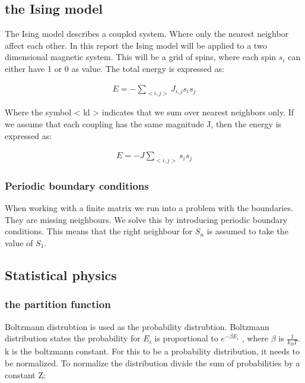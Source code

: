 
\subsection{the Ising model}

The Ising model describes a coupled system. Where only the nearest neighbor affect each other. In this report the Ising model will be applied to a two dimensional magnetic system. This will be a grid of spins, where each spin $s_i$ can either have 1 or 0 as value. The total energy is expressed as: 


\begin{align*}
	E = - \sum_{<i,j>} J_{i,j} s_i s_j
\end{align*}

Where the symbol < kl > indicates that we sum over nearest neighbors only.
If we assume that each coupling has the same magnitude J, then the energy is expressed as: 

\begin{align}
	E = - J \sum_{<i,j>} s_i s_j
	\label{eq:ising-energy}
\end{align}

\subsubsection{Periodic boundary conditions}

When working with a finite matrix we run into a problem with the boundaries. They are missing neighbours. We solve this by introducing periodic boundary conditions. This means that the right neighbour for $S_n$ is assumed to take the value of $S_1$. 

\subsection{Statistical physics}

\subsubsection{the partition function}\label{sec:z-func}

Boltzmann distrubtion is used as the probability distrubtion. Boltzmann distribution states the probability for $E_i$ is proportional to $e^{-\beta E_i}$ , where $\beta$ is $\frac{1}{k_BT}$. k is the boltzmann constant. For this to be a probability distribution, it needs to be normalized. To normalize the distribution divide the sum of probabilities by a constant Z: 

